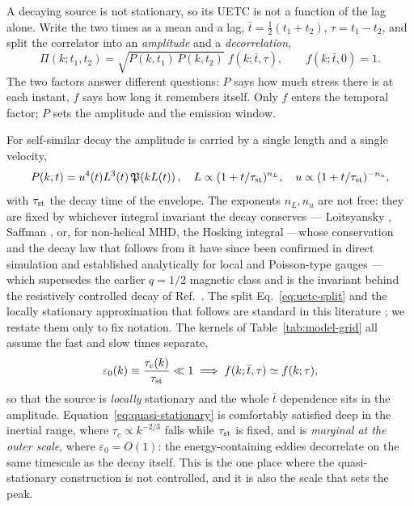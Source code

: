 \documentclass[10pt,prd,aps,nobibnotes,superscriptaddress,preprintnumbers,notitlepage]{revtex4-1}
\newcommand{\add}[1]{{\color{red}#1}}
\newcommand{\add}[1]{#1}
\begin{document}
A decaying source is not stationary, so its UETC is not a function of the lag
alone. Write the two times as a mean and a lag,
$\bar t=\tfrac12(t_1+t_2)$, $\tau=t_1-t_2$, and split the correlator into an
\emph{amplitude} and a \emph{decorrelation},
\begin{equation}
  \Pi(k;t_1,t_2)=\sqrt{P(k,t_1)\,P(k,t_2)}\;f(k;\bar t,\tau),
  \qquad f(k;\bar t,0)=1 .
  \label{eq:uetc-split}
\end{equation}
The two factors answer different questions: $P$ says how much stress there is at
each instant, $f$ says how long it remembers itself. Only $f$ enters the temporal
factor; $P$ sets the amplitude and the emission window.

For self-similar decay the amplitude is carried by a single length and a single
velocity,
\begin{equation}
  P(k,t)=u^{4}(t)L^{3}(t)\,\mathfrak{P}\!\left(kL(t)\right),\quad
  L\propto(1+t/\tau_{\rm st})^{n_L},\quad
  u\propto(1+t/\tau_{\rm st})^{-n_u},
  \label{eq:selfsimilar-envelope}
\end{equation}
with $\tau_{\rm st}$ the decay time of the envelope. The exponents $n_L,n_u$ are
not free: they are fixed by whichever integral invariant the decay conserves ---
Loitsyansky \cite{Batchelor:1953}, Saffman \cite{Saffman:1967}, or, for
non-helical MHD, the Hosking integral
\cite{Hosking:2020wom,Hosking:2022umv}\add{---whose conservation and the decay law that
follows from it have since been confirmed in direct simulation
\cite{Zhou:2022xhk,Brandenburg:2023rrd} and established analytically for local and
Poisson-type gauges \cite{Hew:2025zyh}}---
which supersedes the earlier $q=1/2$ magnetic class and is the invariant behind
the resistively controlled decay of Ref.~\cite{Brandenburg:2024tyi}. The split Eq.~\eqref{eq:uetc-split} and the locally stationary approximation that
follows are standard in this literature
\cite{Caprini:2009yp,Auclair:2022jod,Stomberg:2025kxf}; we restate them only to fix
notation. The kernels of Table~\ref{tab:model-grid} all assume the fast and slow
times separate,
\begin{equation}
  \varepsilon_0(k)\equiv\frac{\tau_c(k)}{\tau_{\rm st}}\ll1
  \;\Longrightarrow\;
  f(k;\bar t,\tau)\simeq f(k;\tau),
  \label{eq:quasi-stationary}
\end{equation}
so that the source is \emph{locally} stationary and the whole $\bar t$ dependence
sits in the amplitude. Equation~\eqref{eq:quasi-stationary} is comfortably
satisfied deep in the inertial range, where $\tau_c\propto k^{-2/3}$ falls while
$\tau_{\rm st}$ is fixed, and is \emph{marginal at the outer scale}, where
$\varepsilon_0=O(1)$: the energy-containing eddies decorrelate on the same
timescale as the decay itself. This is the one place where the quasi-stationary
construction is not controlled, and it is also the scale that sets the peak.
\end{document}
